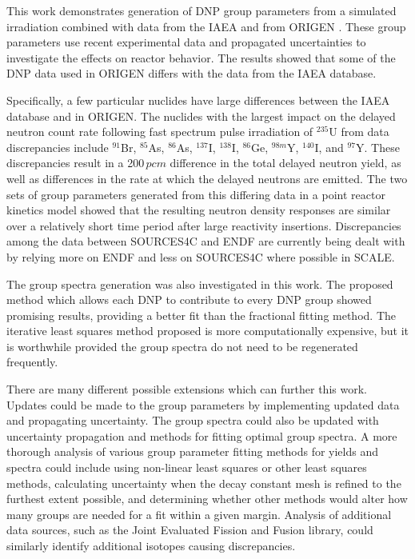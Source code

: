 \documentclass{style/nseJournal}
\begin{document}
This work demonstrates generation of DNP group parameters from a simulated irradiation combined with data from the IAEA and from ORIGEN \cite{DIMITRIOU2021144}.
These group parameters use recent experimental data and propagated uncertainties to investigate the effects on reactor behavior.
The results showed that some of the DNP data used in ORIGEN differs with the data from the IAEA database.

Specifically, a few particular nuclides have large differences between the IAEA database and in ORIGEN.
The nuclides with the largest impact on the delayed neutron count rate following fast spectrum pulse irradiation of $^{235}$U from data discrepancies include $^{91}$Br, $^{85}$As, $^{86}$As, $^{137}$I, $^{138}$I, $^{86}$Ge, $^{98m}$Y, $^{140}$I, and $^{97}$Y.
These discrepancies result in a 200$\,pcm$ difference in the total delayed neutron yield, as well as differences in the rate at which the delayed neutrons are emitted.
The two sets of group parameters generated from this differing data in a point reactor kinetics model showed that the resulting neutron density responses are similar over a relatively short time period after large reactivity insertions.
Discrepancies among the data between SOURCES4C and ENDF are currently being dealt with by relying more on ENDF and less on SOURCES4C where possible in SCALE.

The group spectra generation was also investigated in this work.
The proposed method which allows each DNP to contribute to every DNP group showed promising results, providing a better fit than the fractional fitting method.
The iterative least squares method proposed is more computationally expensive, but it is worthwhile provided the group spectra do not need to be regenerated frequently.

There are many different possible extensions which can further this work.
Updates could be made to the group parameters by implementing updated data and propagating uncertainty.
The group spectra could also be updated with uncertainty propagation and methods for fitting optimal group spectra.
A more thorough analysis of various group parameter fitting methods for yields and spectra could include using non-linear least squares or other least squares methods, calculating uncertainty when the decay constant mesh is refined to the furthest extent possible, and determining whether other methods would alter how many groups are needed for a fit within a given margin. 
Analysis of additional data sources, such as the Joint Evaluated Fission and Fusion library, could similarly identify additional isotopes causing discrepancies.
\end{document}
